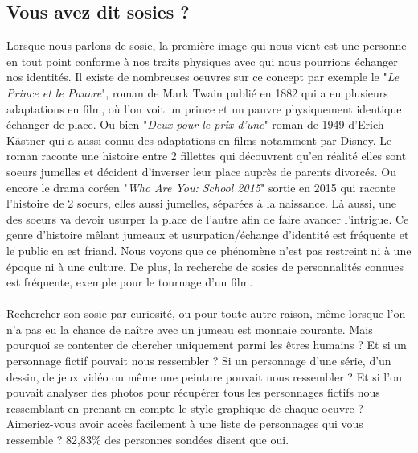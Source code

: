 \documentclass[a4paper,12pt]{article}
\begin{document}
\subsection{Vous avez dit sosies ?}
Lorsque nous parlons de sosie, la première image qui nous vient est une personne en tout point conforme à nos traits physiques avec qui nous pourrions échanger nos identités. Il existe de nombreuses oeuvres sur ce concept par exemple le "\textit{Le Prince et le Pauvre}", roman de Mark Twain publié en 1882 qui a eu plusieurs adaptations en film, où l'on voit un prince et un pauvre physiquement identique échanger de place. Ou bien "\textit{Deux pour le prix d'une}" roman de 1949 d'Erich Kästner qui a aussi connu des adaptations en films notamment par Disney. Le roman raconte une histoire entre 2 fillettes qui découvrent qu'en réalité elles sont soeurs jumelles et décident d'inverser leur place auprès de parents divorcés. Ou encore le drama coréen "\textit{Who Are You: School 2015}" sortie en 2015 qui raconte l'histoire de 2 soeurs, elles aussi jumelles, séparées à la naissance. Là aussi, une des soeurs va devoir usurper la place de l'autre afin de faire avancer l'intrigue. Ce genre d'histoire mêlant jumeaux et usurpation/échange d'identité est fréquente et le public en est friand. Nous voyons que ce phénomène n'est pas restreint ni à une époque ni à une culture. De plus, la recherche de sosies de personnalités connues est fréquente, exemple pour le tournage d'un film. 
\\ \\
Rechercher son sosie par curiosité, ou pour toute autre raison, même lorsque l'on n'a pas eu la chance de naître avec un jumeau est monnaie courante. Mais pourquoi se contenter de chercher uniquement parmi les êtres humains ? Et si un personnage fictif pouvait nous ressembler ? Si un personnage d'une série, d'un dessin, de jeux vidéo ou même une peinture pouvait nous ressembler ? Et si l'on pouvait analyser des photos pour récupérer tous les personnages fictifs nous ressemblant en prenant en compte le style graphique de chaque oeuvre ? Aimeriez-vous avoir accès facilement à une liste de personnages qui vous ressemble ? 82,83\% des personnes sondées disent que oui. 
\\ \\
\end{document}
